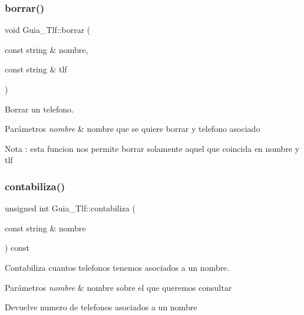 \subsubsection{\texorpdfstring{borrar()}{borrar()}\hspace{0.1cm}{\footnotesize\ttfamily [2/2]}}
{\footnotesize\ttfamily void Guia\+\_\+\+Tlf\+::borrar (\begin{DoxyParamCaption}\item[{const string \&}]{nombre,  }\item[{const string \&}]{tlf }\end{DoxyParamCaption})\hspace{0.3cm}{\ttfamily [inline]}}



Borrar un telefono. 


\begin{DoxyParams}{Parámetros}
{\em nombre} & nombre que se quiere borrar y telefono asociado \\
\hline
\end{DoxyParams}
\begin{DoxyNote}{Nota}
\+: esta funcion nos permite borrar solamente aquel que coincida en nombre y tlf 
\end{DoxyNote}
\mbox{\label{classGuia__Tlf_a5589a65f9ad68fc0c3d5181680078543}} 
\subsubsection{\texorpdfstring{contabiliza()}{contabiliza()}}
{\footnotesize\ttfamily unsigned int Guia\+\_\+\+Tlf\+::contabiliza (\begin{DoxyParamCaption}\item[{const string \&}]{nombre }\end{DoxyParamCaption}) const\hspace{0.3cm}{\ttfamily [inline]}}



Contabiliza cuantos telefonos tenemos asociados a un nombre. 


\begin{DoxyParams}{Parámetros}
{\em nombre} & nombre sobre el que queremos consultar \\
\hline
\end{DoxyParams}
\begin{DoxyReturn}{Devuelve}
numero de telefonos asociados a un nombre 
\end{DoxyReturn}
\mbox{\label{classGuia__Tlf_a71f06ef3b7ffd29dc02153a42916d3d5}} 

